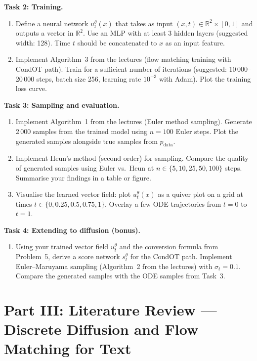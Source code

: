 \documentclass[11pt]{article}
\theoremstyle{definition}
\theoremstyle{remark}
\newcommand{\R}{\mathbb{R}}
\begin{document}
\textbf{Task 2: Training.}
\begin{enumerate}\renewcommand{\labelenumi}{(\alph{enumi})}
\item Define a neural network $u_t^\theta(x)$ that takes as input $(x, t) \in \R^2 \times [0,1]$ and outputs a vector in $\R^2$. Use an MLP with at least 3 hidden layers (suggested width: 128). Time $t$ should be concatenated to $x$ as an input feature.
\item Implement Algorithm~3 from the lectures (flow matching training with CondOT path). Train for a sufficient number of iterations (suggested: 10\,000--20\,000 steps, batch size 256, learning rate $10^{-3}$ with Adam). Plot the training loss curve.
\end{enumerate}

\textbf{Task 3: Sampling and evaluation.}
\begin{enumerate}\renewcommand{\labelenumi}{(\alph{enumi})}
\item Implement Algorithm~1 from the lectures (Euler method sampling). Generate 2\,000 samples from the trained model using $n = 100$ Euler steps. Plot the generated samples alongside true samples from $p_{\mathrm{data}}$.
\item Implement Heun's method (second-order) for sampling. Compare the quality of generated samples using Euler vs.\ Heun at $n \in \{5, 10, 25, 50, 100\}$ steps. Summarise your findings in a table or figure.
\item Visualise the learned vector field: plot $u_t^\theta(x)$ as a quiver plot on a grid at times $t \in \{0, 0.25, 0.5, 0.75, 1\}$. Overlay a few ODE trajectories from $t=0$ to $t=1$.
\end{enumerate}

\textbf{Task 4: Extending to diffusion (bonus).}
\begin{enumerate}\renewcommand{\labelenumi}{(\alph{enumi})}
\item Using your trained vector field $u_t^\theta$ and the conversion formula from Problem~5, derive a score network $s_t^\theta$ for the CondOT path. Implement Euler--Maruyama sampling (Algorithm~2 from the lectures) with $\sigma_t = 0.1$. Compare the generated samples with the ODE samples from Task~3.
\end{enumerate}

\newpage

\section*{Part III: Literature Review --- Discrete Diffusion and Flow Matching for Text}
\end{document}
